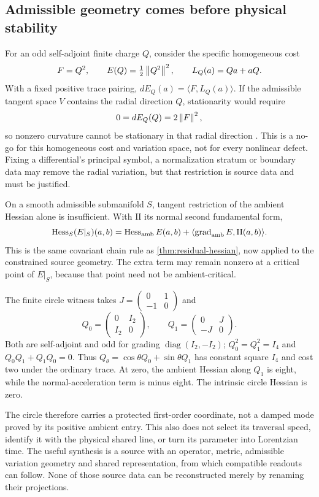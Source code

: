 \documentclass[11pt,a4paper]{article}
\begin{document}
\subsection{Admissible geometry comes before physical stability}
\label{sec:admissible-radial-circle}
For an odd self-adjoint finite charge \(Q\), consider the specific
homogeneous cost
\[
 F=Q^2,\qquad E(Q)=\tfrac12\left\lVert Q^2 \right\rVert^2,
 \qquad L_Q(a)=Qa+aQ.
\]
With a fixed positive trace pairing, \(dE_Q(a)=\langle F,L_Q(a)\rangle\).
If the admissible tangent space \(V\) contains the radial direction
\(Q\), stationarity would require
\[
 0=dE_Q(Q)=2\left\lVert F \right\rVert^2,
\]
so nonzero curvature cannot be stationary in that radial direction
\cite{PreprojectionAdmissibleTangent2026}. This is a no-go for this
homogeneous cost and variation space, not for every nonlinear defect.
Fixing a differential's principal symbol, a normalization stratum or
boundary data may remove the radial variation, but that restriction is
source data and must be justified.

On a smooth admissible submanifold \(S\), tangent restriction of the
ambient Hessian alone is insufficient. With \(\mathrm{II}\) its normal
second fundamental form,
\[
 \operatorname{Hess}_S(E|_S)(a,b)=\operatorname{Hess}_{\rm amb}E(a,b)
            +\langle\operatorname{grad}_{\rm amb}E,\mathrm{II}(a,b)\rangle.
\]
This is the same covariant chain rule as
\cref{thm:residual-hessian}, now applied to the constrained source geometry.
The extra term may remain nonzero at a critical point of \(E|_S\),
because that point need not be ambient-critical.

The finite circle witness takes \(J=\left(\begin{smallmatrix}0&1\\-1&0
\end{smallmatrix}\right)\) and
\[
 Q_0=\begin{pmatrix}0&I_2\\I_2&0\end{pmatrix},\qquad
 Q_1=\begin{pmatrix}0&J\\-J&0\end{pmatrix}.
\]
Both are self-adjoint and odd for grading \(\operatorname{diag}(I_2,-I_2)\);
\(Q_0^2=Q_1^2=I_4\) and \(Q_0Q_1+Q_1Q_0=0\). Thus
\(Q_\theta=\cos\theta Q_0+\sin\theta Q_1\) has constant square
\(I_4\) and cost two under the ordinary trace. At zero, the ambient
Hessian along \(Q_1\) is eight, while the normal-acceleration term is
minus eight. The intrinsic circle Hessian is zero.

The circle therefore carries a protected first-order coordinate, not a
damped mode proved by its positive ambient entry. This also does not
select its traversal speed, identify it with the physical shared line,
or turn its parameter into Lorentzian time. The useful synthesis is a
source with an operator, metric, admissible variation geometry and shared
representation, from which compatible readouts can follow. None of those
source data can be reconstructed merely by renaming their projections.
\end{document}
